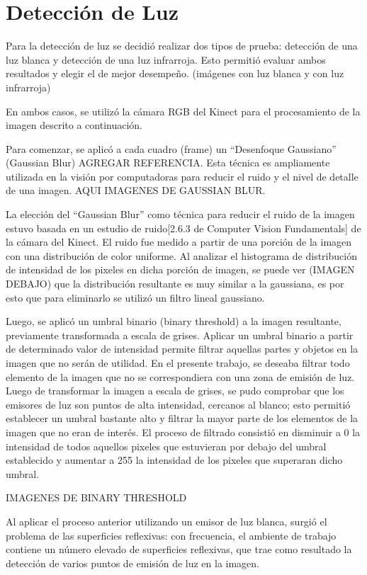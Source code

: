 \documentclass{article}
\begin{document}
\section{Detección de Luz}\label{detecciuxf3n-de-luz}

Para la detección de luz se decidió realizar dos tipos de prueba:
detección de una luz blanca y detección de una luz infrarroja. Esto
permitió evaluar ambos resultados y elegir el de mejor desempeño.
(imágenes con luz blanca y con luz infrarroja)

En ambos casos, se utilizó la cámara RGB del Kinect para el
procesamiento de la imagen descrito a continuación.

Para comenzar, se aplicó a cada cuadro (frame) un ``Desenfoque
Gaussiano'' (Gaussian Blur) AGREGAR REFERENCIA. Esta técnica es
ampliamente utilizada en la visión por computadoras para reducir el
ruido y el nivel de detalle de una imagen. AQUI IMAGENES DE GAUSSIAN
BLUR.

La elección del ``Gaussian Blur'' como técnica para reducir el ruido de
la imagen estuvo basada en un estudio de ruido{[}2.6.3 de Computer
Vision Fundamentals{]} de la cámara del Kinect. El ruido fue medido a
partir de una porción de la imagen con una distribución de color
uniforme. Al analizar el histograma de distribución de intensidad de los
pixeles en dicha porción de imagen, se puede ver (IMAGEN DEBAJO) que la
distribución resultante es muy similar a la gaussiana, es por esto que
para eliminarlo se utilizó un filtro lineal gaussiano.

Luego, se aplicó un umbral binario (binary threshold) a la imagen
resultante, previamente transformada a escala de grises. Aplicar un
umbral binario a partir de determinado valor de intensidad permite
filtrar aquellas partes y objetos en la imagen que no serán de utilidad.
En el presente trabajo, se deseaba filtrar todo elemento de la imagen
que no se correspondiera con una zona de emisión de luz. Luego de
transformar la imagen a escala de grises, se pudo comprobar que los
emisores de luz son puntos de alta intensidad, cercanos al blanco; esto
permitió establecer un umbral bastante alto y filtrar la mayor parte de
los elementos de la imagen que no eran de interés. El proceso de
filtrado consistió en disminuir a 0 la intensidad de todos aquellos
pixeles que estuvieran por debajo del umbral establecido y aumentar a
255 la intensidad de los pixeles que superaran dicho umbral.

IMAGENES DE BINARY THRESHOLD

Al aplicar el proceso anterior utilizando un emisor de luz blanca,
surgió el problema de las superficies reflexivas: con frecuencia, el
ambiente de trabajo contiene un número elevado de superficies
reflexivas, que trae como resultado la detección de varios puntos de
emisión de luz en la imagen.
\end{document}
